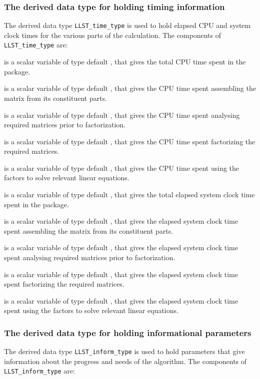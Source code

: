 \documentclass{galahad}
\newcommand{\packagename}{LLST}
\begin{document}
\subsubsection{The derived data type for holding timing 
 information}\label{typetime}
The derived data type 
{\tt \packagename\_time\_type} 
is used to hold elapsed CPU and system clock times for the various parts of 
the calculation. The components of 
{\tt \packagename\_time\_type} 
are:
\begin{description}
 is a scalar variable of type default \realdp, that gives
 the total CPU time spent in the package.

 is a scalar variable of type default \realdp, that gives
 the CPU time spent assembling the matrix  from its constituent parts.

 is a scalar variable of type default \realdp, that gives
 the CPU time spent analysing required matrices prior to factorization.

 is a scalar variable of type default \realdp, that gives
 the CPU time spent factorizing the required matrices.

 is a scalar variable of type default \realdp, that gives
 the CPU time spent using the factors to solve relevant linear equations.

 is a scalar variable of type default \realdp, that gives
 the total elapsed system clock time spent in the package.

 is a scalar variable of type default \realdp, that gives
 the elapsed system clock time spent assembling the matrix  from 
its constituent parts.

 is a scalar variable of type default \realdp, that gives
 the elapsed system clock time spent analysing required matrices prior to 
factorization.

 is a scalar variable of type default \realdp, that gives
 the elapsed system clock time spent factorizing the required matrices.

 is a scalar variable of type default \realdp, that gives
 the elapsed system clock time spent using the factors to solve relevant 
linear equations.

\end{description}


\subsubsection{The derived data type for holding informational
 parameters}\label{typeinform}
The derived data type 
{\tt \packagename\_inform\_type} 
is used to hold parameters that give information about the progress and needs 
of the algorithm. The components of
{\tt \packagename\_inform\_type} 
are:
\end{document}
